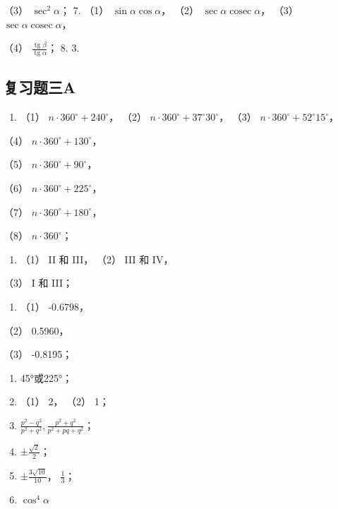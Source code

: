 （3） \(\sec^2\alpha\)； 7. （1） \(\sin \alpha \cos \alpha\)， （2）
\(\sec \alpha \operatorname{cosec} \alpha\)， （3）
\(\sec \alpha \operatorname{cosec} \alpha\)，

（4） \(\frac{\operatorname{tg}\beta}{\operatorname{tg}\alpha}\)； 8. 3.

\subsection{复习题三A}

\begin{enumerate}
\item
  （1） \(n \cdot 360^{\circ} + 240^{\circ}\)， （2）
  \(n \cdot 360^{\circ} + 37^{\circ}30^{\circ}\)， （3）
  \(n \cdot 360^{\circ} + 52^{\circ}15^{\circ}\)，
\end{enumerate}

（4） \(n \cdot 360^{\circ} + 130^{\circ}\)，

（5） \(n \cdot 360^{\circ} + 90^{\circ}\)，

（6） \(n \cdot 360^{\circ} + 225^{\circ}\)，

（7） \(n \cdot 360^{\circ} + 180^{\circ}\)，

（8） \(n \cdot 360^{\circ}\)；

\begin{enumerate}[start=2]
\item
  （1） II 和 III， （2） III 和 IV，
\end{enumerate}

（3） I 和 III；

\begin{enumerate}[start=3]
\item
  （1） -0.6798，
\end{enumerate}

（2） 0.5960，

（3） -0.8195；

\begin{enumerate}[start=5]
\item
  45°或225°；
\item
  （1） 2， （2） 1；
\item
  \(\frac{p^2 - q^2}{p^2 + q^2}, \frac{p^2 + q^2}{p^2 + pq + q^2}\)；
\item
  ±\(\frac{\sqrt{2}}{2}\)；
\item
  ±\(\frac{3\sqrt{10}}{10}\)， \(\frac{1}{3}\)；
\item
  \(\cos^4\alpha\)
\end{enumerate}

